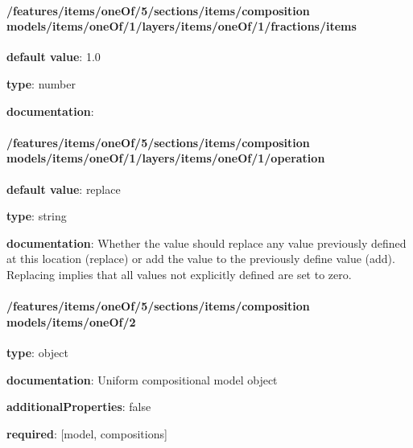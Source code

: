\begin{itemized}
\paragraph{/features/items/oneOf/5/sections/items/composition models/items/oneOf/1/layers/items/oneOf/1/fractions/items} \begin{itemized}
\item {\bf default value}: 1.0
\item {\bf type}: number
\item {\bf documentation}: 
\end{itemized}\end{itemized}\paragraph{/features/items/oneOf/5/sections/items/composition models/items/oneOf/1/layers/items/oneOf/1/operation} \begin{itemized}
\item {\bf default value}: replace
\item {\bf type}: string
\item {\bf documentation}: Whether the value should replace any value previously defined at this location (replace) or add the value to the previously define value (add). Replacing implies that all values not explicitly defined are set to zero.
\end{itemized}\paragraph{/features/items/oneOf/5/sections/items/composition models/items/oneOf/2} \begin{itemized}
\item {\bf type}: object
\item {\bf documentation}: Uniform compositional model object
\item {\bf additionalProperties}: false
\item {\bf required}: [model, compositions]\end{itemized}
